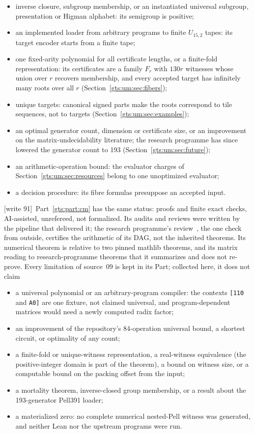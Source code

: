 \documentclass[11pt,letterpaper]{article}
\theoremstyle{definition}
\theoremstyle{remark}
\newcommand{\wtagd}{\textup{[write 91]}}
\begin{document}
\begin{itemize}
\item inverse closure, subgroup membership, or an instantiated universal subgroup, presentation or Higman alphabet: its semigroup is positive;
\item an implemented loader from arbitrary programs to finite $U_{15,2}$ tapes: its target encoder starts from a finite tape;
\item one fixed-arity polynomial for all certificate lengths, or a finite-fold representation: its certificates are a family $F_r$ with $130r$ witnesses whose union over $r$ recovers membership, and every accepted target has infinitely many roots over all $r$ (Section~\ref{gts:um:sec:fibers});
\item unique targets: canonical signed parts make the roots correspond to tile sequences, not to targets (Section~\ref{gts:um:sec:examples});
\item an optimal generator count, dimension or certificate size, or an improvement on the matrix-undecidability literature; the research programme has since lowered the generator count to 193 (Section~\ref{gts:um:sec:future});
\item an arithmetic-operation bound: the evaluator charges of Section~\ref{gts:um:sec:resources} belong to one unoptimized evaluator;
\item a decision procedure: its fibre formulas presuppose an accepted input.
\end{itemize}
\wtagd\ Part~\ref{gts:part:cm} has the same status: proofs and finite exact checks, AI-assisted, unrefereed, not formalized. Its audits and reviews were written by the pipeline that delivered it; the research programme's review~\cite{repo-revcm}, the one check from outside, certifies the arithmetic of its DAG, not the inherited theorems. Its numerical theorem is relative to two pinned mathlib theorems, and its matrix reading to research-programme theorems that it summarizes and does not re-prove. Every limitation of source~09 is kept in its Part; collected here, it does not claim
\begin{itemize}
\item a universal polynomial or an arbitrary-program compiler: the contexts \texttt{[110} and \texttt{A0]} are one fixture, not claimed universal, and program-dependent matrices would need a newly computed radix factor;
\item an improvement of the repository's 84-operation universal bound, a shortest circuit, or optimality of any count;
\item a finite-fold or unique-witness representation, a real-witness equivalence (the positive-integer domain is part of the theorem), a bound on witness size, or a computable bound on the packing offset from the input;
\item a mortality theorem, inverse-closed group membership, or a result about the 193-generator Pell391 loader;
\item a materialized zero: no complete numerical nested-Pell witness was generated, and neither Lean nor the upstream programs were run.
\end{itemize}
\end{document}
